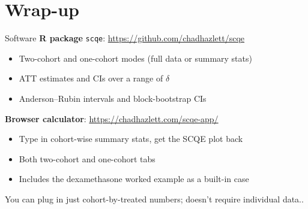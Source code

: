 \documentclass[xcolor=dvipsnames]{beamer}
\newcommand\makegaps{\addtolength{\itemsep}{.25\baselineskip}}
\begin{document}

\section{Wrap-up}

\begin{frame}{Software}
 \textbf{R package} \texttt{scqe}: \url{https://github.com/chadhazlett/scqe}\\
\small
\begin{itemize}
\item Two-cohort and one-cohort modes (full data or summary stats)
\item ATT estimates and CIs over a range of $\delta$
\item Anderson--Rubin intervals and block-bootstrap CIs
\end{itemize}
\bigskip
\normalsize
{} \textbf{Browser calculator}: \url{https://chadhazlett.com/scqe-app/}\\
\small
\begin{itemize}
\item Type in cohort-wise summary stats, get the SCQE plot back
\item Both two-cohort and one-cohort tabs
\item Includes the dexamethasone worked example as a built-in case
\end{itemize}
\bigskip
\normalsize
{} You can plug in just cohort-by-treated numbers; doesn't require individual data.. 
\end{frame}
\end{document}
